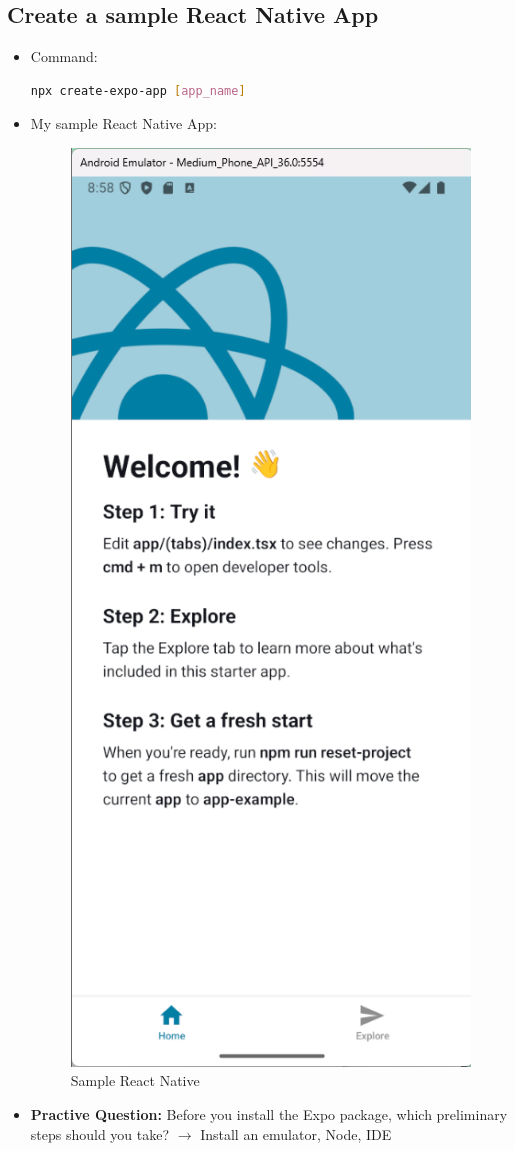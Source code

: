 \subsection{Create a sample React Native App}
\begin{itemize}
    \item Command:
    \begin{lstlisting}[language=Bash, numbers=none]
        npx create-expo-app [app_name]
    \end{lstlisting}
    \item My sample React Native App:
    \begin{figure}[H]
        \centering
        \includegraphics[width=0.2\linewidth]{images/react-native-sample.pdf}
        \caption{Sample React Native}
        \label{fig:react-native-sample}
    \end{figure}
    \item \textbf{Practive Question:} Before you install the Expo package, which preliminary steps should you take?
    $\rightarrow$ Install an emulator, Node, IDE
\end{itemize}